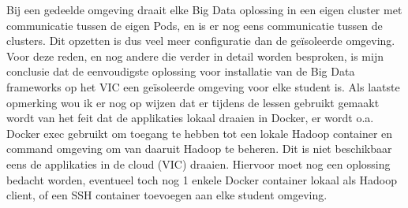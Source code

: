 Bij een gedeelde omgeving draait elke Big Data oplossing in een eigen cluster met communicatie tussen de eigen Pods, en is er nog eens communicatie tussen de clusters. Dit opzetten is dus veel meer configuratie dan de geïsoleerde omgeving.
\newline
Voor deze reden, en nog andere die verder in detail worden besproken, is mijn conclusie dat de eenvoudigste oplossing voor installatie van de Big Data frameworks op het VIC een geïsoleerde omgeving voor elke student is.
\newline
\newline
Als laatste opmerking wou ik er nog op wijzen dat er tijdens de lessen gebruikt gemaakt wordt van het feit dat de applikaties lokaal draaien in Docker, er wordt o.a. Docker exec gebruikt om toegang te hebben tot een lokale Hadoop container en command omgeving om van daaruit Hadoop te beheren. Dit is niet beschikbaar eens de applikaties in de cloud (VIC) draaien. Hiervoor moet nog een oplossing bedacht worden, eventueel toch nog 1 enkele Docker container lokaal als Hadoop client, of een SSH container toevoegen aan elke student omgeving.
\newline
